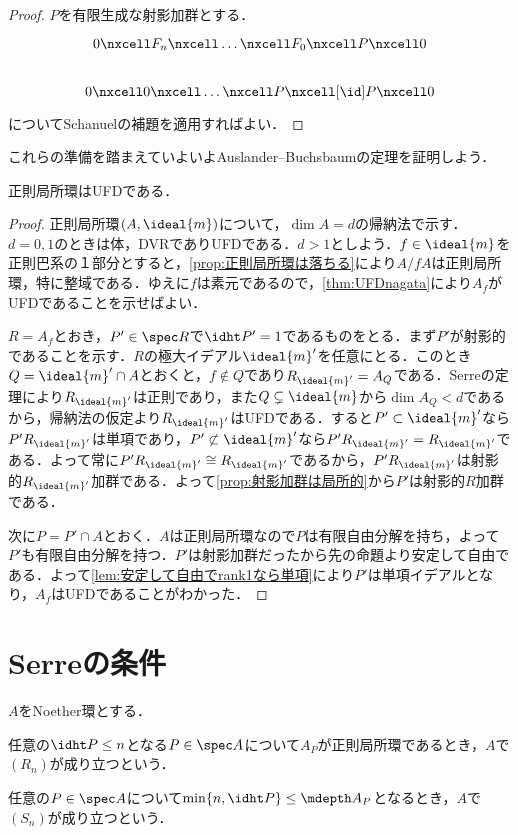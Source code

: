 \begin{proof}
	$P$を有限生成な射影加群とする．
	\[\begin{tikzcd}
		0\nxcell F_n\nxcell\dots\nxcell F_0\nxcell P\nxcell0\\
		0\nxcell 0\nxcell\dots\nxcell P\nxcell[\id] P\nxcell0
	\end{tikzcd}\]	
	についてSchanuelの補題を適用すればよい．
\end{proof}

これらの準備を踏まえていよいよAuslander--Buchsbaumの定理を証明しよう．
\begin{thm}\label{thm:Auslander--Buchsbaumの定理}
	正則局所環はUFDである．
\end{thm}

\begin{proof}
	正則局所環$(A,\ideal{m})$について，$\dim A=d$の帰納法で示す．$d=0,1$のときは体，DVRでありUFDである．$d>1$としよう．$f\in \ideal{m}$を正則巴系の１部分とすると，\ref{prop:正則局所環は落ちる}により$A/fA$は正則局所環，特に整域である．ゆえに$f$は素元であるので，\ref{thm:UFDnagata}により$A_f$がUFDであることを示せばよい．
	
	$R=A_f$とおき，$P'\in\spec R$で$\idht P'=1$であるものをとる．まず$P'$が射影的であることを示す．$R$の極大イデアル$\ideal{m}'$を任意にとる．このとき$Q=\ideal{m}'\cap A$とおくと，$f\not\in Q$であり$R_{\ideal{m}'}=A_Q$である．Serreの定理により$R_{\ideal{m}'}$は正則であり，また$Q\subsetneq\ideal{m}$から$\dim A_Q<d$であるから，帰納法の仮定より$R_{\ideal{m}'}$はUFDである．すると$P'\subset\ideal{m}'$なら$P'R_{\ideal{m}'}$は単項であり，$P'\not\subset\ideal{m}'$なら$P'R_{\ideal{m}'}=R_{\ideal{m}'}$である．よって常に$P'R_{\ideal{m}'}\cong R_{\ideal{m}'}$であるから，$P'R_{\ideal{m}'}$は射影的$R_{\ideal{m}'}$加群である．よって\ref{prop:射影加群は局所的}から$P'$は射影的$R$加群である．
	
	次に$P=P'\cap A$とおく．$A$は正則局所環なので$P$は有限自由分解を持ち，よって$P'$も有限自由分解を持つ．$P'$は射影加群だったから先の命題より安定して自由である．よって\ref{lem:安定して自由でrank1なら単項}により$P'$は単項イデアルとなり，$A_f$はUFDであることがわかった．
\end{proof}

\section{Serreの条件}

\begin{defi}[Serreの条件]
	$A$をNoether環とする．
	\begin{sakura}
		\item 任意の$\idht P\leq n$となる$P\in\spec A$について$A_P$が正則局所環であるとき，$A$で$(R_n)$が成り立つという．
		\item 任意の$P\in\spec A$について$\min\{n,\idht P\}\leq\mdepth A_P$となるとき，$A$で$(S_n)$が成り立つという．
	\end{sakura}
\end{defi}

